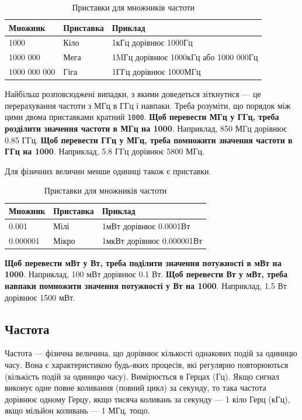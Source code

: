 \documentclass{article}
\begin{document}
\begin{table}[ht]
\centering
\begin{tabular}{|l|l|l|}
\hline
\textbf{Множник} & \textbf{Приставка}  & \textbf{Приклад} \\
\hline
1000           & Кіло   & 1кГц дорівнює 1000Гц \\
1000 000       & Мега   & 1MГц дорівнює 1000кГц або 1000 000Гц \\
1000 000 000   & Гіга   & 1ГГц дорівнює 1000МГц \\
\hline
\end{tabular}
\caption{Приставки для множників частоти}
\end{table}

Найбільш розповсюджені випадки, з якими доведеться зіткнутися --- це перерахування частоти з МГц в ГГц і навпаки. Треба розуміти, що порядок між цими двома приставками кратний \texttt{1000}. \textbf{Щоб перевести МГц у ГГц, треба розділити значення частоти в МГц на 1000}. Наприклад, 850 МГц дорівнює 0.85 ГГц. \textbf{Щоб перевести ГГц у МГц, треба помножити значення частоти в ГГц на 1000}. Наприклад, 5.8 ГГц дорівнює 5800 МГц.

\newpage
Для фізичних величин менше одиниці також є приставки.

\begin{table}[ht]
\centering
\begin{tabular}{|l|l|l|}
\hline
\textbf{Множник} & \textbf{Приставка}  & \textbf{Приклад} \\
\hline
0.001           & Мілі   & 1мВт дорівнює 0.0001Вт \\
0.000001        & Мікро  & 1мкВт дорівнює 0.000001Вт \\
\hline
\end{tabular}
\caption{Приставки для множників частоти}
\end{table}

\textbf{Щоб перевести мВт у Вт, треба поділити значення потужності в мВт на 1000}. Наприклад, 100 мВт дорівнює 0.1 Вт. \textbf{Щоб перевести Вт у мВт, треба навпаки помножити значення потужності у Вт на 1000}. Наприклад, 1.5 Вт дорівнює 1500 мВт.

\subsection{Частота}
Частота --- фізична величина, що дорівнює кількості однакових подій за одиницю часу. Вона є характеристикою будь-яких процесів, які регулярно повторюються (кількість подій за одиницю часу). Вимірюється в Герцах (Гц). Якщо сигнал виконує одне повне коливання (повний цикл) за секунду, то така частота дорівнює одному Герцу, якщо тисяча коливань за секунду --- 1 кіло Герц (кГц), якщо мільйон коливань --- 1 МГц, тощо.
\end{document}

